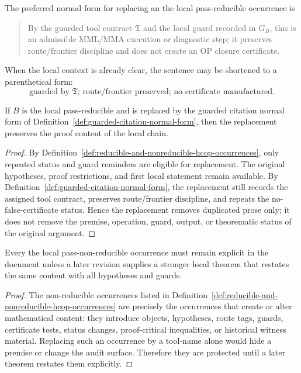 \begin{definition}
\label{def:guarded-citation-normal-form}
The preferred normal form for replacing an the local pass-reducible occurrence is
\begin{quote}
\small
By the guarded tool contract \(\mathfrak T\) and the local guard recorded in \(G_B\), this is an admissible MML/MMA execution or diagnostic step; it preserves route/frontier discipline and does not create an OP closure certificate.
\end{quote}
When the local context is already clear, the sentence may be shortened to a parenthetical form:
\[
 \text{guarded by }\mathfrak T\text{; route/frontier preserved; no certificate manufactured.}
\]
\end{definition}

\begin{lemma}
\label{lem:guarded-reduction-preserves-proof-content}
If \(B\) is the local pass-reducible and is replaced by the guarded citation normal form of Definition~\ref{def:guarded-citation-normal-form}, then the replacement preserves the proof content of the local chain.
\end{lemma}

\begin{proof}
By Definition~\ref{def:reducible-and-nonreducible-hcop-occurrences}, only repeated status and guard reminders are eligible for replacement. The original hypotheses, proof restrictions, and first local statement remain available. By Definition~\ref{def:guarded-citation-normal-form}, the replacement still records the assigned tool contract, preserves route/frontier discipline, and repeats the no-false-certificate status. Hence the replacement removes duplicated prose only; it does not remove the premise, operation, guard, output, or theorematic status of the original argument.
\end{proof}

\begin{lemma}
\label{lem:nonreducible-occurrences-protect-theorematic-status}
Every the local pass-non-reducible occurrence must remain explicit in the document unless a later revision supplies a stronger local theorem that restates the same content with all hypotheses and guards.
\end{lemma}

\begin{proof}
The non-reducible occurrences listed in Definition~\ref{def:reducible-and-nonreducible-hcop-occurrences} are precisely the occurrences that create or alter mathematical content: they introduce objects, hypotheses, route tags, guards, certificate tests, status changes, proof-critical inequalities, or historical witness material. Replacing such an occurrence by a tool-name alone would hide a premise or change the audit surface. Therefore they are protected until a later theorem restates them explicitly.
\end{proof}

